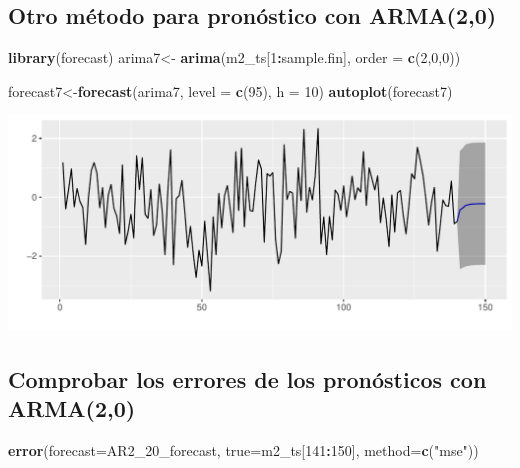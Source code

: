 \documentclass[
  11pt,
]{article}
\newenvironment{Shaded}{\begin{snugshade}}{\end{snugshade}}
\newcommand{\DataTypeTok}[1]{\textcolor[rgb]{0.13,0.29,0.53}{#1}}
\newcommand{\DecValTok}[1]{\textcolor[rgb]{0.00,0.00,0.81}{#1}}
\newcommand{\KeywordTok}[1]{\textcolor[rgb]{0.13,0.29,0.53}{\textbf{#1}}}
\newcommand{\NormalTok}[1]{#1}
\newcommand{\OperatorTok}[1]{\textcolor[rgb]{0.81,0.36,0.00}{\textbf{#1}}}
\newcommand{\StringTok}[1]{\textcolor[rgb]{0.31,0.60,0.02}{#1}}
\begin{document}
\hypertarget{otro-muxe9todo-para-pronuxf3stico-con-arma20}{%
\subsection{Otro método para pronóstico con
ARMA(2,0)}\label{otro-muxe9todo-para-pronuxf3stico-con-arma20}}

\begin{Shaded}
\begin{Highlighting}[]
\KeywordTok{library}\NormalTok{(forecast)}
\NormalTok{arima7<-}\StringTok{ }\KeywordTok{arima}\NormalTok{(m2_ts[}\DecValTok{1}\OperatorTok{:}\NormalTok{sample.fin], }\DataTypeTok{order =} \KeywordTok{c}\NormalTok{(}\DecValTok{2}\NormalTok{,}\DecValTok{0}\NormalTok{,}\DecValTok{0}\NormalTok{))}
\end{Highlighting}
\end{Shaded}

\begin{Shaded}
\begin{Highlighting}[]
\NormalTok{forecast7<-}\KeywordTok{forecast}\NormalTok{(arima7, }\DataTypeTok{level =} \KeywordTok{c}\NormalTok{(}\DecValTok{95}\NormalTok{), }\DataTypeTok{h =} \DecValTok{10}\NormalTok{)}
\KeywordTok{autoplot}\NormalTok{(forecast7)}
\end{Highlighting}
\end{Shaded}

\begin{center}\includegraphics[width=0.9\linewidth]{RmdFigs/f_otro1-1} \end{center}

\hypertarget{comprobar-los-errores-de-los-pronuxf3sticos-con-arma20}{%
\subsection{Comprobar los errores de los pronósticos con
ARMA(2,0)}\label{comprobar-los-errores-de-los-pronuxf3sticos-con-arma20}}

\begin{Shaded}
\begin{Highlighting}[]
\KeywordTok{error}\NormalTok{(}\DataTypeTok{forecast=}\NormalTok{AR2_}\DecValTok{20}\NormalTok{_forecast, }\DataTypeTok{true=}\NormalTok{m2_ts[}\DecValTok{141}\OperatorTok{:}\DecValTok{150}\NormalTok{], }\DataTypeTok{method=}\KeywordTok{c}\NormalTok{(}\StringTok{"mse"}\NormalTok{))}
\end{Highlighting}
\end{Shaded}
\end{document}
